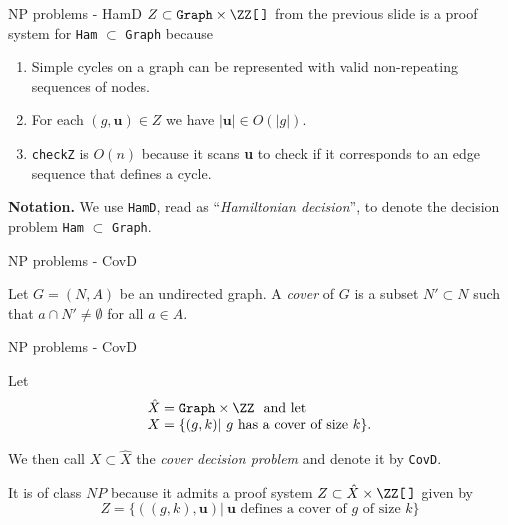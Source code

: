 %

\begin{frame}{NP problems - HamD}
	\(
		Z \subset \mathtt{Graph} \times \ZZ\texttt{[\,]} 
	\)
	from the previous slide is a proof system for \texttt{Ham} $\subset$
	\texttt{Graph} because
	\begin{enumerate}
		\item Simple cycles on a graph can be represented with valid
			non-repeating sequences of nodes.
		\item For each
			\(
				(g, \mathbf{u}) \in Z
			\)
			we have $|\mathbf{u}| \in O(|g|)$.
		\item \texttt{checkZ} is $O(n)$ because it scans \textbf{u} to check
			if it corresponds to an edge sequence that defines a cycle.
	\end{enumerate}

	\bigskip

	\textbf{Notation.} We use \texttt{HamD}, read as ``\emph{Hamiltonian decision}'',
	to denote the decision problem \texttt{Ham} $\subset$ \texttt{Graph}.
\end{frame}

\begin{frame}{NP problems - CovD}
	\begin{defn}
		Let $G= (N, A)$ be an undirected graph. A \emph{cover} of $G$ is a
		subset $N' \subset N$ such that $a \cap N' \neq \emptyset$ for all
		$a \in A$.
	\end{defn}
\end{frame}

\begin{frame}{NP problems - CovD}
	\begin{defn}
		Let
		\[
			\begin{array}{l}
				\hat{X}= \mathtt{Graph} \times \ZZ\ \mbox{ and let}\\
				X=
				\{
					(g, k) |\ \mbox{$g$ has a cover of size $k$}
				\}. 
			\end{array}
		\]

		We then call
		\(
			X \subset \hat{X}
		\)
		the \emph{cover decision problem} and denote it by \texttt{CovD}.
	\end{defn}

	\bigskip
	It is of class $NP$ because it admits a proof system
	\(
		Z \subset \hat{X} \times \ZZ\texttt{[\,]}
	\)
	given by
	\[
		Z=
		\{
			((g,k), \mathbf{u}) |\ 
			\mbox{$\mathbf{u}$ defines a cover of $g$ of size $k$}
		\}
	\]
\end{frame}


